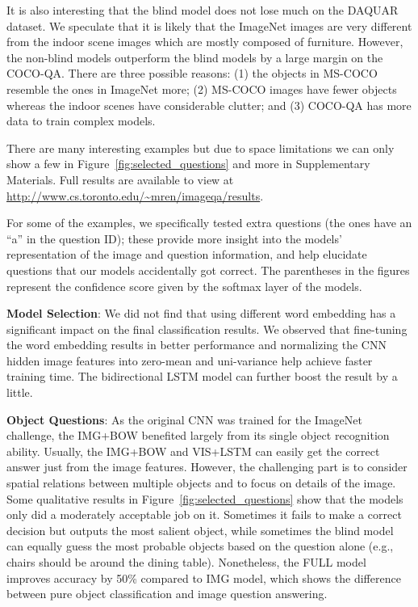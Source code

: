 \documentclass{article}
\renewcommand{\*}[1]{\textbf{#1}}
\begin{document}
It is also interesting that the blind model does not lose much on the DAQUAR 
dataset. We speculate that it is likely that the ImageNet images are very 
different from the indoor scene images which are mostly composed of furniture. 
However, the non-blind models outperform the blind models by a large margin on 
the COCO-QA. There are three possible reasons: (1) the objects in MS-COCO 
resemble the ones in ImageNet more; (2) MS-COCO images have fewer objects 
whereas the indoor scenes have considerable clutter; and (3) COCO-QA has more 
data to train complex models.

There are many interesting examples but due to space limitations we can only 
show a few in Figure~\ref{fig:selected_questions} and more in Supplementary 
Materials. Full results are available to view at 
\url{http://www.cs.toronto.edu/~mren/imageqa/results}.

For some of the examples, we specifically tested extra questions (the ones have 
an ``a'' in the question ID); these provide more insight into the models' 
representation of the image and question information, and help elucidate 
questions that our models accidentally got correct. The parentheses in the 
figures represent the confidence score given by the softmax layer of the 
models. 

\*{Model Selection}: We did not find that using different word embedding 
has a significant impact on the final classification results. We observed that 
fine-tuning the word embedding results in better performance and normalizing 
the CNN hidden image features into zero-mean and uni-variance help achieve 
faster training time. The bidirectional LSTM model can further boost the result 
by a little. 

\*{Object Questions}: As the original CNN was trained for the ImageNet 
challenge, the IMG+BOW benefited largely from its single object recognition 
ability. Usually, the IMG+BOW and VIS+LSTM can easily get the correct answer 
just from the image features. However, the challenging part is to consider 
spatial relations between multiple objects and to focus on details of the 
image. Some qualitative results in Figure~\ref{fig:selected_questions} show 
that the models only did a moderately acceptable job on it. Sometimes it fails 
to make a correct decision but outputs the most salient object, while sometimes 
the blind model can equally guess the most probable objects based on the 
question alone (e.g., chairs should be around the dining table). Nonetheless, 
the FULL model improves accuracy by 50\% compared to IMG model, which shows the 
difference between pure object classification and image question answering.
\end{document}
